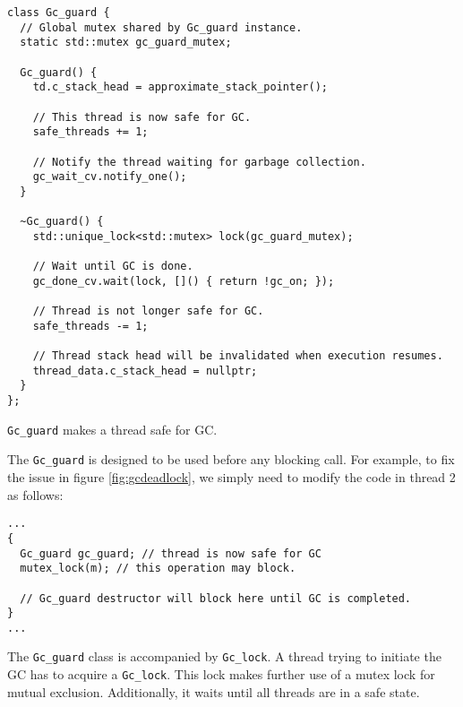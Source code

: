 \begin{code}
\begin{verbatim}
class Gc_guard {
  // Global mutex shared by Gc_guard instance.
  static std::mutex gc_guard_mutex;

  Gc_guard() {
    td.c_stack_head = approximate_stack_pointer();

    // This thread is now safe for GC.
    safe_threads += 1;

    // Notify the thread waiting for garbage collection.
    gc_wait_cv.notify_one();
  }

  ~Gc_guard() {
    std::unique_lock<std::mutex> lock(gc_guard_mutex);

    // Wait until GC is done.
    gc_done_cv.wait(lock, []() { return !gc_on; });

    // Thread is not longer safe for GC.
    safe_threads -= 1;

    // Thread stack head will be invalidated when execution resumes.
    thread_data.c_stack_head = nullptr;
  }
};
\end{verbatim}
\caption{\texttt{Gc\_guard} makes a thread safe for GC.}
\label{code:gc-guard}
\end{code}

The \verb|Gc_guard| is designed to be used before any blocking call. For example,
to fix the issue in figure \ref{fig:gcdeadlock}, we simply need to modify the
code in thread 2 as follows:

\begin{code}
\begin{verbatim}
...
{
  Gc_guard gc_guard; // thread is now safe for GC
  mutex_lock(m); // this operation may block.

  // Gc_guard destructor will block here until GC is completed.
}
...
\end{verbatim}
\end{code}

The \texttt{Gc\_guard} class is accompanied by \texttt{Gc\_lock}. A thread trying to initiate the GC has to
acquire a \texttt{Gc\_lock}. This lock makes further use of a mutex lock for mutual exclusion.
Additionally, it waits until all threads are in a safe state.

